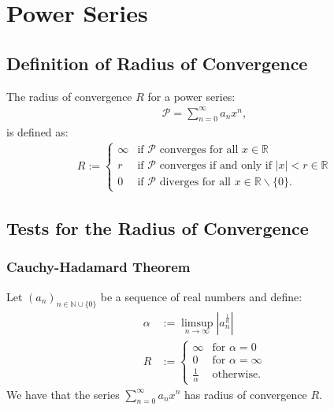 \documentclass[a4paper, 12pt, twoside]{article}
\begin{document}
\section{Power Series}

\subsection{Definition of Radius of Convergence}

The radius of convergence $R$ for a power series:
\begin{align*}
      \mathcal{P} = \sum_{n = 0}^\infty a_nx^n,
\end{align*}
is defined as:
\begin{align*}
      R := \begin{cases}
            \infty & \text{if $\mathcal{P}$ converges for all } x \in \mathbb{R}                \\
            r      & \text{if $\mathcal{P}$ converges if and only if } |x| < r \in \mathbb{R}   \\
            0      & \text{if $\mathcal{P}$ diverges for all } x \in \mathbb{R}\backslash\{0\}.
      \end{cases}
\end{align*}

\newpage

\subsection{Tests for the Radius of Convergence}

\subsubsection{Cauchy-Hadamard Theorem}

Let $(a_n)_{n\in\mathbb{N}\cup\{0\}}$ be a sequence of real numbers and define:
\begin{align*}
      \alpha & := \limsup_{n\to\infty}|a_n^{\frac{1}{n}}| \\
      R      & := \begin{cases}
            \infty           & \text{for } \alpha = 0      \\
            0                & \text{for } \alpha = \infty \\
            \frac{1}{\alpha} & \text{otherwise}.
      \end{cases}
\end{align*}
We have that the series $\sum_{n = 0}^\infty a_nx^n$ has radius of convergence $R$.
\end{document}
